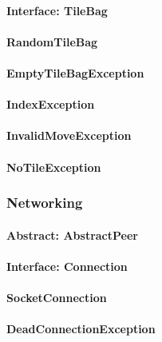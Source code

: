 \documentclass[12pt, letterpaper]{article}
\begin{document}
    \paragraph{Interface: TileBag}

    \paragraph{RandomTileBag}


    \paragraph{EmptyTileBagException}

    \paragraph{IndexException}

    \paragraph{InvalidMoveException}

    \paragraph{NoTileException}


    \subsubsection{Networking}

    \paragraph{Abstract: AbstractPeer}

    \paragraph{Interface: Connection}

    \paragraph{SocketConnection}

    \paragraph{DeadConnectionException}
\end{document}
